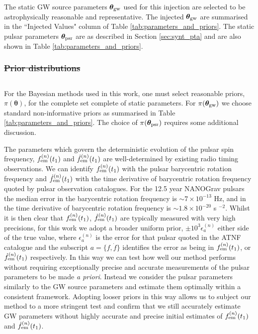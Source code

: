 \documentclass[fleqn,usenatbib,useAMS]{mnras}
\providecommand{\DIFadd}[1]{{\protect\color{blue}\uwave{#1}}} %
\providecommand{\DIFdel}[1]{{\protect\color{red}\sout{#1}}}                      %
\providecommand{\DIFaddbegin}{} %
\providecommand{\DIFaddend}{} %
\providecommand{\DIFdelbegin}{} %
\providecommand{\DIFdelend}{} %
\newcommand{\DIFscaledelfig}{0.5}
\newlength{\DIFdelgraphicswidth} %
\newlength{\DIFdelgraphicsheight} %
\newcommand{\DIFaddincludegraphics}[2][]{{\color{blue}\fbox{\DIFOincludegraphics[#1]{#2}}}} %
\newcommand{\DIFdelincludegraphics}[2][]{%
\sbox{\DIFdelgraphicsbox}{\DIFOincludegraphics[#1]{#2}}%
\settoboxwidth{\DIFdelgraphicswidth}{\DIFdelgraphicsbox} %
\settoboxtotalheight{\DIFdelgraphicsheight}{\DIFdelgraphicsbox} %
\scalebox{\DIFscaledelfig}{%
\parbox[b]{\DIFdelgraphicswidth}{\usebox{\DIFdelgraphicsbox}\\[-\baselineskip] \rule{\DIFdelgraphicswidth}{0em}}\llap{\resizebox{\DIFdelgraphicswidth}{\DIFdelgraphicsheight}{%
\setlength{\unitlength}{\DIFdelgraphicswidth}%
\begin{picture}(1,1)%
\thicklines\linethickness{2pt} %
{\color[rgb]{1,0,0}\put(0,0){\framebox(1,1){}}}%
{\color[rgb]{1,0,0}\put(0,0){\line( 1,1){1}}}%
{\color[rgb]{1,0,0}\put(0,1){\line(1,-1){1}}}%
\end{picture}%
}\hspace*{3pt}}} %
} %
\DeclareRobustCommand{\DIFaddbegin}{\DIFOaddbegin \let\includegraphics\DIFaddincludegraphics} %
\DeclareRobustCommand{\DIFaddend}{\DIFOaddend \let\includegraphics\DIFOincludegraphics} %
\DeclareRobustCommand{\DIFdelbegin}{\DIFOdelbegin \let\includegraphics\DIFdelincludegraphics} %
\DeclareRobustCommand{\DIFdelend}{\DIFOaddend \let\includegraphics\DIFOincludegraphics} %
\begin{document}
\DIFaddend The static GW source parameters $\boldsymbol{\theta}_{\rm gw}$ used for this injection are selected to be astrophysically reasonable and representative. The injected $\boldsymbol{\theta}_{\rm gw}$ are summarised in the ``Injected Values" column of Table \ref{tab:parameters_and_priors}. The static pulsar parameters $\boldsymbol{\theta}_{\rm psr}$ are as described in Section \ref{sec:synt_pta} and are also shown in Table \ref{tab:parameters_and_priors}. 

\DIFdelbegin \subsubsection{\DIFdel{Prior distributions}}%
\addtocounter{subsubsection}{-1}%
\DIFdelend \DIFaddbegin \subsection{\DIFadd{Prior distributions}}\DIFaddend \label{sec:priors}
For the Bayesian methods used in this work, one must select reasonable priors, $\pi(\boldsymbol{\theta})$, for the complete set complete of static parameters. For $\pi(\boldsymbol{\theta}_{\rm gw})$ we choose standard non-informative priors \citep[e.g.][]{Bhagwat2021} as summarised in Table \ref{tab:parameters_and_priors}. The choice of $\pi(\boldsymbol{\theta}_{\rm psr})$ requires some additional discussion. \newline 


The parameters which govern the deterministic evolution of the pulsar spin frequency, $f_{\rm em}^{(n)} (t_1)$ and $\dot{f}_{\rm em}^{(n)} (t_1)$ are well-determined by existing radio timing observations. We can identify $f_{\rm em}^{(n)} (t_1)$ with the pulsar barycentric rotation frequency and $\dot{f}_{\rm em}^{(n)} (t_1)$ with the time derivative of barycentric rotation frequency quoted by pulsar observation catalogues. For the 12.5 year NANOGrav pulsars the median error in  the barycentric rotation frequency is $\sim 7 \times 10^{-13}$ Hz, and in the time derivative of barycentric rotation frequency is $\sim 1.8 \times 10^{-20}$ s $^{-2}$. Whilst it is then clear that $f_{\rm em}^{(n)} (t_1)$, $\dot{f}_{\rm em}^{(n)} (t_1)$ are typically measured with very high precisions, for this work we adopt a broader uniform prior, $\pm 10^3 \epsilon^{(n)}_{a}$ either side of the true value, where $\epsilon^{(n)}_{a}$ is the error for that pulsar quoted in the ATNF catalogue and the subscript $a = \{ f, \dot{f} \}$ identifies the error as being in $f_{\rm em}^{(n)} (t_1)$, or $\dot{f}_{\rm em}^{(n)} (t_1)$ respectively. In this way we can test how well our method performs without requiring exceptionally precise and accurate measurements of the pulsar parameters to be made \textit{a priori}. Instead we consider the pulsar parameters similarly to the GW source parameters and estimate them optimally within a consistent framework. Adopting looser priors in this way allows us to subject our method to a more stringent test and confirm that we still accurately estimate GW parameters without highly accurate and precise initial estimates of $f_{\rm em}^{(n)} (t_1)$ and $\dot{f}_{\rm em}^{(n)} (t_1)$. \newline 
\end{document}
